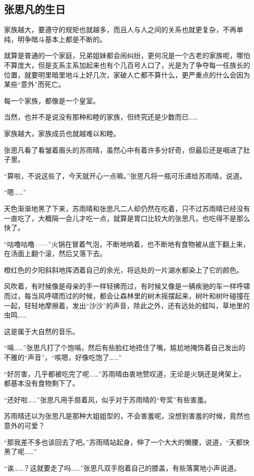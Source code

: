 \subsection{张思凡的生日}

家族越大，要遵守的规矩也就越多，而且人与人之间的关系也就更复杂，不再单纯，明争暗斗基本上都是不断的。

就算是普通的一个家庭，兄弟姐妹都会闹纠纷，更何况是一个古老的家族呢，哪怕不算庞大，但是支系主系加起来也有个几百号人口了，光是为了争夺每一任族长的位置，就要明里暗里地斗上好几次，家破人亡都不算什么，更严重点的什么会因为某些“意外”而死亡。

每一个家族，都像是一个皇室。

当然，也并不是说没有那种和睦的家族，但终究还是少数而已……

家族越大，家族成员也就越难以和睦。

张思凡看了看皱着眉头的苏雨晴，虽然心中有着许多分好奇，但最后还是咽进了肚子里。

“算啦，不说这些了，今天就开心一点嘛。”张思凡将一瓶可乐递给苏雨晴，说道。

“嗯……”

天色渐渐地黑了下来，苏雨晴和张思凡二人却仍然在吃着，只不过苏雨晴已经没有一直吃了，大概隔一会儿才吃一点，就算是胃口比较大的张思凡，也吃得不是那么快了。

“咕噜咕噜——”火锅在冒着气泡，不断地响着，也不断地有食物被从底下翻上来，在汤面上翻个滚，然后又落下去。

橙红色的夕阳斜斜地挥洒着自己的余光，将远处的一片湖水都染上了它的颜色。

风吹着，有时候像是母亲的手一样轻拂而过，有时候又像是一辆疾驰的车一样呼啸而过，每当风呼啸而过的时候，都会让森林里的树木摇摆起来，树叶和树叶碰撞在一起，轻轻地摩擦着，发出“沙沙”的声音，除此之外，还有远处的蛙叫，草地里的虫鸣……

这是属于大自然的音乐。

“嗝……”张思凡打了个饱嗝，然后有些脸红地捂住了嘴，尴尬地掩饰着自己发出的不雅的“声音”，“咳嗯，好像吃饱了……”

“好厉害，几乎都被吃完了呢……”苏雨晴由衷地赞叹道，无论是火锅还是烤架上，都基本没有食物剩下了。

“还好啦……”张思凡用手扇着风，似乎对于苏雨晴的“夸奖”有些害羞。

苏雨晴还以为张思凡是那种大姐姐型的，不会害羞呢，没想到害羞的时候，竟然也意外的可爱？

“那我差不多也该回去了吧。”苏雨晴站起身，伸了一个大大的懒腰，说道，“天都快黑了呢……”

“诶……？这就要走了吗……”张思凡双手抱着自己的膝盖，有些落寞地小声说道。

